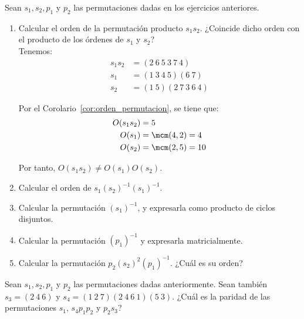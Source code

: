 \begin{ejercicio}\label{ej:2.17}
    Sean $s_1, s_2, p_1$ y $p_2$ las permutaciones dadas en los ejercicios anteriores.
    \begin{enumerate}
        \item Calcular el orden de la permutación producto $s_1s_2$. ¿Coincide dicho orden con el producto de los órdenes de $s_1$ y $s_2$?\\
        
        Tenemos:
        \begin{align*}
            s_1s_2 &= (2\ 6\ 5\ 3\ 7\ 4)\\
            s_1 &= (1\ 3\ 4\ 5)(6\ 7)\\
            s_2 &= (1\ 5)(2\ 7\ 3\ 6\ 4)
        \end{align*}

        Por el Corolario~\ref{cor:orden_permutacion}, se tiene que:
        \begin{align*}
            O(s_1s_2) &= 5\\
            O(s_1) &= \mcm(4, 2) = 4\\
            O(s_2) &= \mcm(2, 5) = 10
        \end{align*}

        Por tanto, $O(s_1s_2) \neq O(s_1)O(s_2)$.
        
        \item Calcular el orden de $s_1(s_2)^{-1}(s_1)^{-1}$.
        \item Calcular la permutación $(s_1)^{-1}$, y expresarla como producto de ciclos disjuntos.
        \item Calcular la permutación $(p_1)^{-1}$ y expresarla matricialmente.
        \item Calcular la permutación $p_2(s_2)^2(p_1)^{-1}$. ¿Cuál es su orden?
    \end{enumerate}
\end{ejercicio}

\begin{ejercicio}\label{ej:2.18}
    Sean $s_1, s_2, p_1$ y $p_2$ las permutaciones dadas anteriormente. Sean también $s_3 = (2\ 4\ 6)$ y $s_4 = (1\ 2\ 7)(2\ 4\ 6\ 1)(5\ 3)$. ¿Cuál es la paridad de las permutaciones $s_1$, $s_4p_1p_2$ y $p_2s_3$?
\end{ejercicio}


